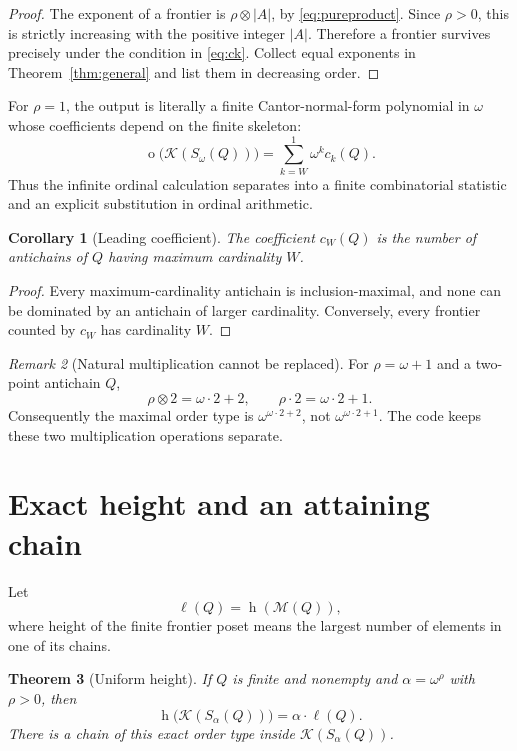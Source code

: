 \documentclass[11pt,a4paper]{article}
\newtheorem{theorem}{Theorem}[section]
\newtheorem{corollary}[theorem]{Corollary}
\theoremstyle{definition}
\theoremstyle{remark}
\newtheorem{remark}[theorem]{Remark}
\newcommand{\K}{\mathcal K}
\newcommand{\M}{\mathcal M}
\newcommand{\ot}{\operatorname{o}}
\newcommand{\hgt}{\operatorname{h}}
\newcommand{\np}{\mathbin{\otimes}}
\begin{document}
\begin{proof}
The exponent of a frontier is $\rho\np|A|$, by
\eqref{eq:pureproduct}. Since $\rho>0$, this is strictly increasing with
the positive integer $|A|$. Therefore a frontier survives precisely under
the condition in \eqref{eq:ck}. Collect equal exponents in
Theorem~\ref{thm:general} and list them in decreasing order.
\end{proof}

For $\rho=1$, the output is literally a finite Cantor-normal-form polynomial
in $\omega$ whose coefficients depend on the finite skeleton:
\[
 \ot\bigl(\K(S_\omega(Q))\bigr)
       =\sum_{k=W}^{1}\omega^k c_k(Q).
\]
Thus the infinite ordinal calculation separates into a finite combinatorial
statistic and an explicit substitution in ordinal arithmetic.

\begin{corollary}[Leading coefficient]\label{cor:leading}
The coefficient $c_W(Q)$ is the number of antichains of $Q$ having maximum
cardinality $W$.
\end{corollary}
\begin{proof}
Every maximum-cardinality antichain is inclusion-maximal, and none can be
dominated by an antichain of larger cardinality. Conversely, every
frontier counted by $c_W$ has cardinality $W$.
\end{proof}

\begin{remark}[Natural multiplication cannot be replaced]
For $\rho=\omega+1$ and a two-point antichain $Q$,
\[
 \rho\np2=\omega\cdot2+2,
 \qquad \rho\cdot2=\omega\cdot2+1.
\]
Consequently the maximal order type is
$\omega^{\omega\cdot2+2}$, not $\omega^{\omega\cdot2+1}$.
The code keeps these two multiplication operations separate.
\end{remark}

\section{Exact height and an attaining chain}\label{sec:height}

Let
\[
 \ell(Q)=\hgt(\M(Q)),
\]
where height of the finite frontier poset means the largest number of
elements in one of its chains.

\begin{samepage}
\begin{theorem}[Uniform height]\label{thm:height}
If $Q$ is finite and nonempty and $\alpha=\omega^\rho$ with $\rho>0$, then
\begin{equation}\label{eq:height}
 \boxed{\displaystyle
 \hgt\bigl(\K(S_\alpha(Q))\bigr)=\alpha\cdot\ell(Q).}
\end{equation}
There is a chain of this exact order type inside $\K(S_\alpha(Q))$.
\end{theorem}
\end{samepage}
\end{document}
